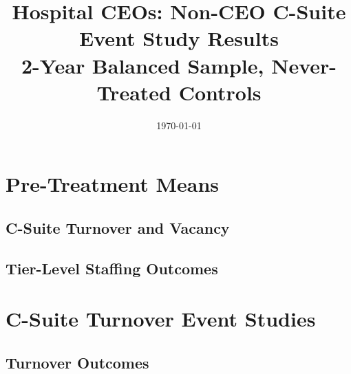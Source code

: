 \documentclass[11pt]{article}
\title{Hospital CEOs: Non-CEO C-Suite Event Study Results\\
       \large 2-Year Balanced Sample, Never-Treated Controls}
\date{\today}
\begin{document}
\maketitle
\tableofcontents
\clearpage

\section{Pre-Treatment Means}

\subsection{C-Suite Turnover and Vacancy}



\subsection{Tier-Level Staffing Outcomes}



\clearpage

\section{C-Suite Turnover Event Studies}

\subsection{Turnover Outcomes}
\end{document}
